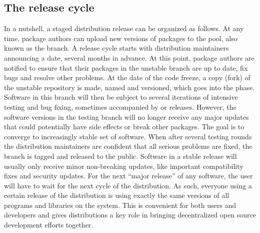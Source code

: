 
\subsection{The release cycle}

In a nutshell, a staged distribution release can be organized as follows. At any
time, package authors can upload new versions of packages to the 
pool, also known as the  branch. A release cycle starts with
distribution maintainers announcing a  date, several
months in advance. At this point, package authors are notified to ensure
that their packages in the unstable branch are up to date, fix bugs and resolve
other problems. At the date of the code freeze, a copy (fork) of the unstable
repository is made, named and versioned, which goes into the 
phase. Software in this branch will then be subject to several iterations of
intensive testing and bug fixing, sometimes accompanied by  or
 releases. However, the software versions in the testing branch will
no longer receive any major updates that could potentially have side effects
or break other packages. The goal is to converge to increasingly stable set of
software. When after several testing rounds the distribution maintainers are
confident that all serious problems are fixed, the branch is tagged 
and released to the public. Software in a stable release will usually only
receive minor non-breaking updates, like important compatibility fixes and
security updates. For the next ``major release'' of any software, the user will
have to wait for the next cycle of the distribution. As such, everyone using a
certain release of the distribution is using exactly the same versions of all programs
and libraries on the system. This is convenient for both users and developers
and gives distributions a key role in bringing decentralized open source
development efforts together.


